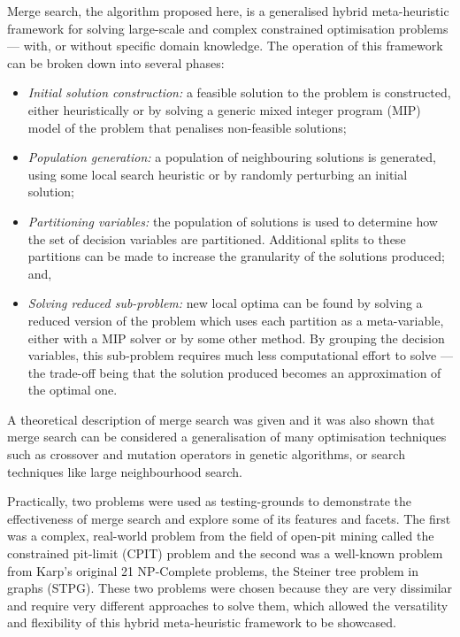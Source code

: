 \documentclass[preprint]{elsarticle}
\begin{document}
Merge search, the algorithm proposed here, is a generalised hybrid meta-heuristic framework for solving large-scale and complex constrained optimisation problems --- with, or without specific domain knowledge. The operation of this framework can be broken down into several phases:
\begin{itemize}
\item \emph{Initial solution construction:} a feasible solution to the problem is constructed, either heuristically or by solving a generic mixed integer program (MIP) model of the problem that penalises non-feasible solutions;
\item \emph{Population generation:} a population of neighbouring solutions is generated, using some local search heuristic or by randomly perturbing an initial solution;
\item \emph{Partitioning variables:} the population of solutions is used to determine how the set of decision variables are partitioned. Additional splits to these partitions can be made to increase the granularity of the solutions produced; and,
\item \emph{Solving reduced sub-problem:} new local optima can be found by solving a reduced version of the problem which uses each partition as a meta-variable, either with a MIP solver or by some other method. By grouping the decision variables, this sub-problem requires much less computational effort to solve --- the trade-off being that the solution produced becomes an approximation of the optimal one.
\end{itemize}

A theoretical description of merge search was given and it was also shown that merge search can be considered a generalisation of many optimisation techniques such as crossover and mutation operators in genetic algorithms, or search techniques like large neighbourhood search.

Practically, two problems were used as testing-grounds to demonstrate the effectiveness of merge search and explore some of its features and facets. The first was a complex, real-world problem from the field of open-pit mining called the constrained pit-limit (CPIT) problem and the second was a well-known problem from Karp's original 21 NP-Complete problems, the Steiner tree problem in graphs (STPG). These two problems were chosen because they are very dissimilar and require very different approaches to solve them, which allowed the versatility and flexibility of this hybrid meta-heuristic framework to be showcased.
\end{document}
